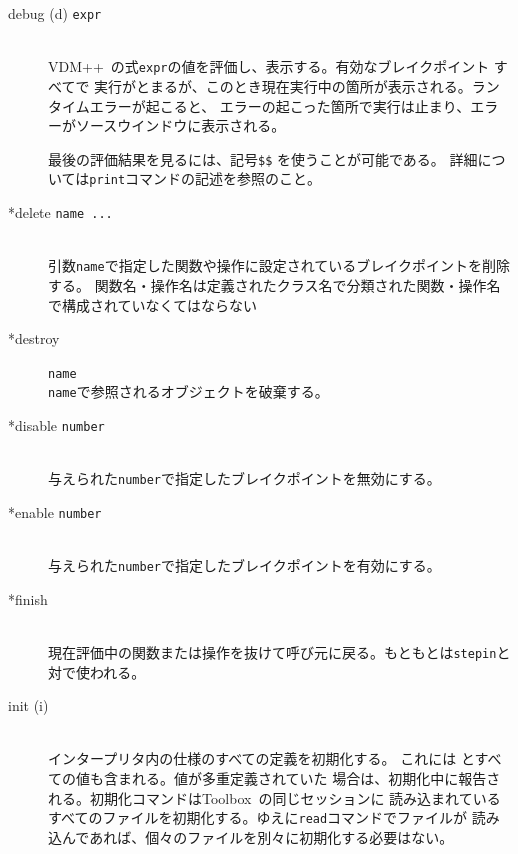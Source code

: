 \documentclass[\pformat,12pt]{jarticle}
\newcommand{\vdmslpp}{VDM++}
\newcommand{\Toolbox}{Toolbox}
\begin{document}
\begin{description}
\item[debug (d) {\tt expr}]  \mbox{}\\
  \vdmslpp\ の式{\tt expr}の値を評価し、表示する。有効なブレイクポイント すべてで
  実行がとまるが、このとき現在実行中の箇所が表示される。ランタイムエラーが起こると、
  エラーの起こった箇所で実行は止まり、エラーがソースウインドウに表示される。
  
  最後の評価結果を見るには、記号{\tt \$\$}\index{\$\$} を使うことが可能である。
  詳細については{\tt print}コマンドの記述を参照のこと。
    
\item[*delete {\tt name ...}] \mbox{}\\
    引数{\tt name}で指定した関数や操作に設定されているブレイクポイントを削除する。
    {%
        関数名・操作名は定義されたクラス名で分類された関数・操作名で構成されていなくてはならない
    }%
    {}%
    
\item[*destroy] {\tt name}\mbox{}\\
  {\tt name}で参照されるオブジェクトを破棄する。

\item[*disable \texttt{number}]
\mbox{}\\
  与えられた{\tt number}で指定したブレイクポイントを無効にする。

\item[*enable \texttt{number}]
\mbox{}\\
  与えられた{\tt number}で指定したブレイクポイントを有効にする。

\item[*finish]\mbox{}\\
  現在評価中の関数または操作を抜けて呼び元に戻る。もともとは{\tt stepin}と対で使われる。


\item[init (i)] \mbox{}\\
  インタープリタ内の仕様のすべての定義を初期化する。
  これには
  とすべての値も含まれる。値が多重定義されていた
  場合は、初期化中に報告される。初期化コマンドは\Toolbox\ の同じセッションに
  読み込まれているすべてのファイルを初期化する。ゆえに{\tt read}コマンドでファイルが
  読み込んであれば、個々のファイルを別々に初期化する必要はない。


\end{description}
\end{document}
